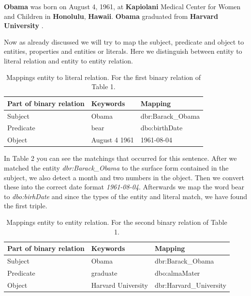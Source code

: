 \documentclass[runningheads]{llncs}
\begin{document}
\begin{example}
\textbf{Obama} was born on August 4, 1961, at \textbf{Kapiolani} Medical Center for
Women and Children in \textbf{Honolulu}, \textbf{Hawaii}. \textbf{Obama} graduated from
\textbf{Harvard University} .\end{example}

Now as already discussed we will try to map the subject, predicate and object to entities, properties and entities or literals. Here we distinguish between entity to literal relation and entity to entity relation.

\begin{table}
	\caption{Mappings entity to literal relation. For the first binary relation of Table 1.}\label{tab2}
	\begin{center}
		\begin{tabularx}{\textwidth}{@{}|l|l|Y|@{}}
			\hline
			\textbf{Part of binary relation} &  \textbf{Keywords} & \textbf{Mapping}\\
			\hline
			Subject &  Obama & dbr:Barack\_Obama\\
			Predicate &  bear & dbo:birthDate\\
			Object &  August 4 1961  & 1961-08-04\\
			\hline
		\end{tabularx}
	\end{center}
\end{table}
In Table 2 you can see the matchings that occurred for this sentence. After we matched the entity 
\textit{dbr:Barack\_Obama} to the surface form contained in the subject, we also detect a month and two numbers in the object. Then we convert these into the correct date format \textit{1961-08-04}. Afterwards we map the 
word bear to \textit{dbo:birhDate} and since the types of the entity and literal match, we have found the first triple.

\begin{table}
	\caption{Mappings entity to entity relation. For the second binary relation of Table 1.}\label{tab3}
	\begin{center}
		\begin{tabularx}{\textwidth}{@{}|l|l|Y|@{}}
			\hline
			\textbf{Part of binary relation} &  \textbf{Keywords} & \textbf{Mapping}\\
			\hline
			Subject &  Obama & dbr:Barack\_Obama\\
			Predicate &  graduate & dbo:almaMater\\
			Object &  Harvard University  & dbr:Harvard\_University\\
			\hline
		\end{tabularx}
	\end{center}
\end{table}
\end{document}
